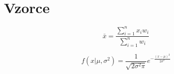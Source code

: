 \documentclass{article}
\begin{document}
\section{Vzorce}
\begin{equation}
\bar{x} = \frac{\sum \limits_{i=1}^{n} x_{i}w_{i}}{\sum \limits_{i=1}^{n} w_i}
\end{equation}


\begin{equation}
f(x|\mu, \sigma ^2) = \frac{1}{\sqrt{2\sigma ^2\pi}} e^{-\frac{(x-\mu)^2}{2\sigma ^2}}
\end{equation}
\end{document}
